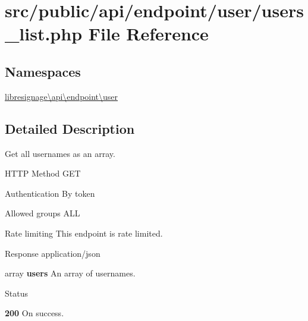 \hypertarget{src_2public_2api_2endpoint_2user_2users__list_8php}{}\section{src/public/api/endpoint/user/users\+\_\+list.php File Reference}
\label{src_2public_2api_2endpoint_2user_2users__list_8php}
\subsection*{Namespaces}
\begin{DoxyCompactItemize}
\item 
 \hyperlink{namespacelibresignage_1_1api_1_1endpoint_1_1user}{libresignage\textbackslash{}api\textbackslash{}endpoint\textbackslash{}user}
\end{DoxyCompactItemize}


\subsection{Detailed Description}
Get all usernames as an array.

\begin{DoxyParagraph}{H\+T\+TP Method}
G\+ET 
\end{DoxyParagraph}
\begin{DoxyParagraph}{Authentication}
By token 
\end{DoxyParagraph}
\begin{DoxyParagraph}{Allowed groups}
{\ttfamily A\+LL} 
\end{DoxyParagraph}
\begin{DoxyParagraph}{Rate limiting}
This endpoint is rate limited.
\end{DoxyParagraph}
\begin{DoxyParagraph}{Response}
application/json
\begin{DoxyItemize}
\item {\ttfamily array} {\bfseries users} An array of usernames.
\end{DoxyItemize}
\end{DoxyParagraph}
\begin{DoxyParagraph}{Status}

\begin{DoxyItemize}
\item {\bfseries 200} On success. 
\end{DoxyItemize}
\end{DoxyParagraph}

